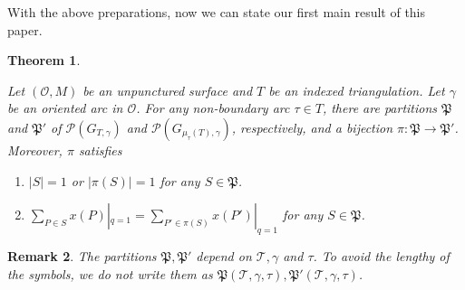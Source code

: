 \documentclass[10pt]{amsart}
\theoremstyle{theorems}
\newtheorem{Theorem}{Theorem}[section]
\newtheorem{Remark}[Theorem]{Remark}
\begin{document}
\medskip

With the above preparations, now we can state our first main result of this paper.

\medskip

\begin{Theorem}\label{partition bi}

Let $(\mathcal O,M)$ be an unpunctured surface and $T$ be an indexed triangulation. Let $\gamma$ be an oriented arc in $\mathcal O$. For any non-boundary arc $\tau\in T$, there are partitions $\mathfrak P$ and $\mathfrak P'$ of $\mathcal P(G_{T,\gamma})$ and $\mathcal P(G_{\mu_{\tau}(T),\gamma})$, respectively, and a bijection $\pi: \mathfrak P\rightarrow \mathfrak P'$. Moreover, $\pi$ satisfies

\begin{enumerate}[$(1)$]

  \item $|S|=1$ or $|\pi(S)|=1$ for any $S\in \mathfrak P$.

  \item $\sum_{P\in S}x(P)|_{q=1}=\sum_{P'\in \pi(S)}x(P')|_{q=1}$ for any $S\in \mathfrak P$.

%

\end{enumerate}

\end{Theorem}

\medskip

\begin{Remark}

The partitions $\mathfrak P, \mathfrak P'$ depend on $\mathcal T, \gamma$ and $\tau$. To avoid the lengthy of the symbols, we do not write them as $\mathfrak P(\mathcal T, \gamma, \tau), \mathfrak P'(\mathcal T, \gamma, \tau)$.

\end{Remark}
\end{document}
